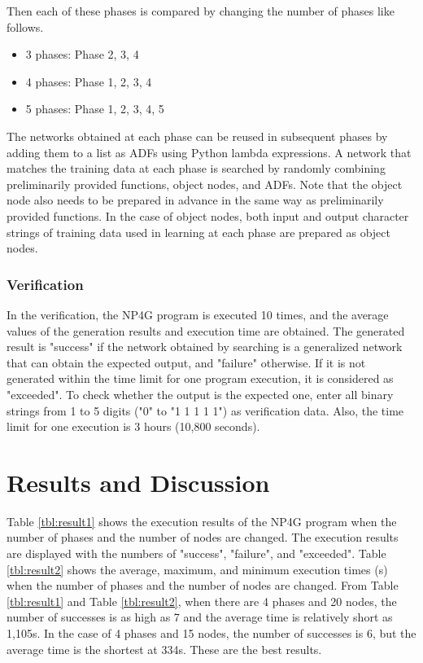 \documentclass{article}
\begin{document}
Then each of these phases is compared by changing the number of phases like follows.
\begin{itemize}
\item 3 phases:
Phase 2, 3, 4
\item 4 phases:
Phase 1, 2, 3, 4
\item 5 phases:
Phase 1, 2, 3, 4, 5
\end{itemize}
\noindent

The networks obtained at each phase can be reused in subsequent phases by adding them to a list as ADFs using Python lambda expressions.
A network that matches the training data at each phase is searched by randomly combining preliminarily provided functions, object nodes, and ADFs.
Note that the object node also needs to be prepared in advance in the same way as preliminarily provided functions.
In the case of object nodes, both input and output character strings of training data used in learning at each phase are prepared as object nodes.

\subsubsection {Verification}
In the verification, the NP4G program is executed 10 times, and the average values of the generation results and execution time are obtained.
The generated result is "success" if the network obtained by searching is a generalized network that can obtain the expected output, and "failure" otherwise. If it is not generated within the time limit for one program execution, it is considered as "exceeded".
To check whether the output is the expected one, enter all binary strings from 1 to 5 digits ("0" to "1 1 1 1 1") as verification data.
Also, the time limit for one execution is 3 hours (10,800 seconds).

\section {Results and Discussion}
Table \ref{tbl:result1} shows the execution results of the NP4G program when the number of phases and the number of nodes are changed.
The execution results are displayed with the numbers of "success", "failure", and "exceeded".
Table \ref{tbl:result2} shows the average, maximum, and minimum execution times (s) when the number of phases and the number of nodes are changed.
From Table \ref{tbl:result1} and Table \ref{tbl:result2}, when there are 4 phases and 20 nodes, the number of successes is as high as 7 and the average time is relatively short as 1,105s.
In the case of 4 phases and 15 nodes, the number of successes is 6, but the average time is the shortest at 334s.
These are the best results.
\end{document}

